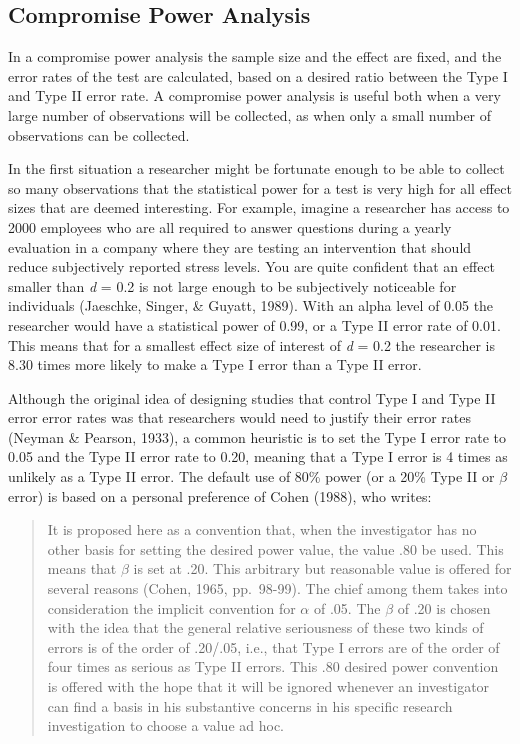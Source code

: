 \documentclass[
  english,
  ,jou, a4paper,floatsintext]{apa6}
\begin{document}
\hypertarget{compromise-power-analysis}{%
\subsection{Compromise Power Analysis}\label{compromise-power-analysis}}

In a compromise power analysis the sample size and the effect are fixed, and the error rates of the test are calculated, based on a desired ratio between the Type I and Type II error rate. A compromise power analysis is useful both when a very large number of observations will be collected, as when only a small number of observations can be collected.

In the first situation a researcher might be fortunate enough to be able to collect so many observations that the statistical power for a test is very high for all effect sizes that are deemed interesting. For example, imagine a researcher has access to 2000 employees who are all required to answer questions during a yearly evaluation in a company where they are testing an intervention that should reduce subjectively reported stress levels. You are quite confident that an effect smaller than \emph{d} = 0.2 is not large enough to be subjectively noticeable for individuals (Jaeschke, Singer, \& Guyatt, 1989). With an alpha level of 0.05 the researcher would have a statistical power of 0.99, or a Type II error rate of 0.01. This means that for a smallest effect size of interest of \emph{d} = 0.2 the researcher is 8.30 times more likely to make a Type I error than a Type II error.

Although the original idea of designing studies that control Type I and Type II error error rates was that researchers would need to justify their error rates (Neyman \& Pearson, 1933), a common heuristic is to set the Type I error rate to 0.05 and the Type II error rate to 0.20, meaning that a Type I error is 4 times as unlikely as a Type II error. The default use of 80\% power (or a 20\% Type II or \(\beta\) error) is based on a personal preference of Cohen (1988), who writes:

\begin{quote}
It is proposed here as a convention that, when the investigator has no other basis for setting the desired power value, the value .80 be used. This means that \(\beta\) is set at .20. This arbitrary but reasonable value is offered for several reasons (Cohen, 1965, pp.~98-99). The chief among them takes into consideration the implicit convention for \(\alpha\) of .05. The \(\beta\) of .20 is chosen with the idea that the general relative seriousness of these two kinds of errors is of the order of .20/.05, i.e., that Type I errors are of the order of four times as serious as Type II errors. This .80 desired power convention is offered with the hope that it will be ignored whenever an investigator can find a basis in his substantive concerns in his specific research investigation to choose a value ad hoc.
\end{quote}
\end{document}
